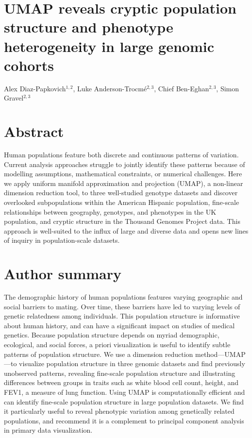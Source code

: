 \section*{UMAP reveals cryptic population structure and phenotype heterogeneity in large genomic cohorts}

Alex Diaz-Papkovich$^{1,2}$, Luke Anderson-Trocm\'{e}$^{2,3}$, Chief Ben-Eghan$^{2,3}$, Simon Gravel$^{2,3}$


\section{Abstract}

Human populations feature both discrete and continuous patterns of variation. Current analysis approaches struggle to jointly identify these patterns because of modelling assumptions, mathematical constraints, or numerical challenges. Here we apply uniform manifold approximation and projection (UMAP), a non-linear dimension reduction tool, to three well-studied genotype datasets and discover overlooked subpopulations within the American Hispanic population, fine-scale relationships between geography, genotypes, and phenotypes in the UK population, and cryptic structure in the Thousand Genomes Project data. This approach is well-suited to the influx of large and diverse data and opens new lines of inquiry in population-scale datasets.

\section{Author summary}

The demographic history of human populations features varying geographic and social barriers to mating. Over time, these barriers have led to varying levels of genetic relatedness among individuals.  This population structure is informative about human history, and can have a significant impact on studies of medical genetics. Because population structure depends on myriad demographic, ecological, and social forces, a priori visualization is useful to identify subtle patterns of population structure. We use a dimension reduction method---UMAP---to visualize population structure in three genomic datasets and find previously unobserved patterns, revealing fine-scale population structure and illustrating differences between groups in traits such as white blood cell count, height, and FEV1, a measure of lung function. Using UMAP is computationally efficient and can identify fine-scale population structure in large population datasets. We find it particularly useful to reveal phenotypic variation among genetically related populations, and recommend it is a complement  to principal component analysis in primary data visualization. 

